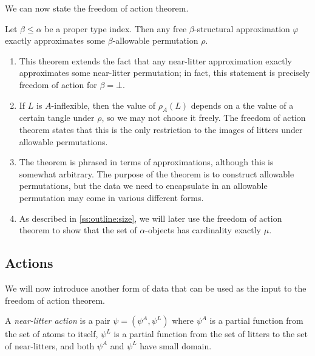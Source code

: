 We can now state the freedom of action theorem.

\begin{theorem}
    \label{thm:foa}
    Let \( \beta \leq \alpha \) be a proper type index.
    Then any free \( \beta \)-structural approximation \( \varphi \) exactly approximates some \( \beta \)-allowable permutation \( \rho \).
\end{theorem}

\begin{remarks}
    \begin{enumerate}
        \item This theorem extends the fact that any near-litter approximation exactly approximates some near-litter permutation; in fact, this statement is precisely freedom of action for \( \beta = \bot \).
        \item If \( L \) is \( A \)-inflexible, then the value of \( \rho_A(L) \) depends on a the value of a certain tangle under \( \rho \), so we may not choose it freely.
        The freedom of action theorem states that this is the only restriction to the images of litters under allowable permutations.
        \item The theorem is phrased in terms of approximations, although this is somewhat arbitrary.
        The purpose of the theorem is to construct allowable permutations, but the data we need to encapsulate in an allowable permutation may come in various different forms.
        \item As described in \cref{ss:outline:size}, we will later use the freedom of action theorem to show that the set of \( \alpha \)-objects has cardinality exactly \( \mu \).
    \end{enumerate}
\end{remarks}

\subsection{Actions}

We will now introduce another form of data that can be used as the input to the freedom of action theorem.

\begin{definition}
    A \emph{near-litter action} is a pair \( \psi = (\psi^A, \psi^L) \) where \( \psi^A \) is a partial function from the set of atoms to itself, \( \psi^L \) is a partial function from the set of litters to the set of near-litters, and both \( \psi^A \) and \( \psi^L \) have small domain.
\end{definition}

